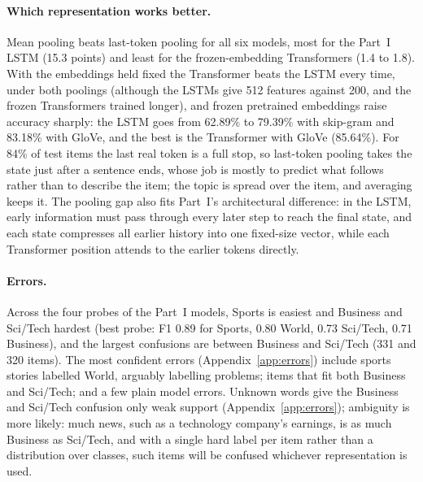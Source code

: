 \documentclass[10pt]{article}
\begin{document}
\paragraph{Which representation works better.} Mean pooling beats last-token pooling for all six models, most for the Part~I LSTM (15.3 points) and least for the frozen-embedding Transformers (1.4 to 1.8). With the embeddings held fixed the Transformer beats the LSTM every time, under both poolings (although the LSTMs give 512 features against 200, and the frozen Transformers trained longer), and frozen pretrained embeddings raise accuracy sharply: the LSTM goes from 62.89\% to 79.39\% with skip-gram and 83.18\% with GloVe, and the best is the Transformer with GloVe (85.64\%). For 84\% of test items the last real token is a full stop, so last-token pooling takes the state just after a sentence ends, whose job is mostly to predict what follows rather than to describe the item; the topic is spread over the item, and averaging keeps it. The pooling gap also fits Part~I's architectural difference: in the LSTM, early information must pass through every later step to reach the final state, and each state compresses all earlier history into one fixed-size vector, while each Transformer position attends to the earlier tokens directly.

\paragraph{Errors.} Across the four probes of the Part~I models, Sports is easiest and Business and Sci/Tech hardest (best probe: F1 0.89 for Sports, 0.80 World, 0.73 Sci/Tech, 0.71 Business), and the largest confusions are between Business and Sci/Tech (331 and 320 items). The most confident errors (Appendix~\ref{app:errors}) include sports stories labelled World, arguably labelling problems; items that fit both Business and Sci/Tech; and a few plain model errors. Unknown words give the Business and Sci/Tech confusion only weak support (Appendix~\ref{app:errors}); ambiguity is more likely: much news, such as a technology company's earnings, is as much Business as Sci/Tech, and with a single hard label per item rather than a distribution over classes, such items will be confused whichever representation is used.
\end{document}

